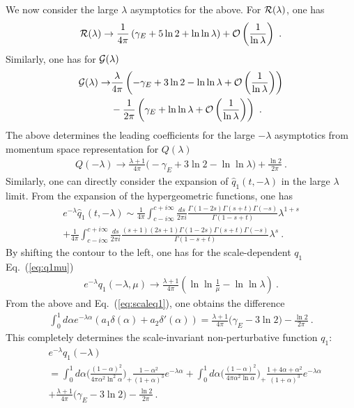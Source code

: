 \documentclass[a4paper,11pt]{article}
\begin{document}
We now consider the large $\lambda$ asymptotics for the above. For ${\cal R}(\lambda)$, one has 
\begin{align}
{\cal R}(\lambda)\rightarrow  \frac{1}{4\pi}\left(\gamma_E+5\ln 2+\ln \ln \lambda\right)+{\cal O}\left(\frac{1}{\ln \lambda}\right) \ .
\end{align}
Similarly, one has for ${\cal G}(\lambda)$
\begin{align}
{\cal G}(\lambda) \rightarrow &\frac{\lambda}{4\pi}\left(-\gamma_E+3\ln 2-\ln \ln \lambda+{\cal O}\left(\frac{1}{\ln \lambda}\right)\right)\nonumber \\ 
&-\frac{1}{2\pi}\left(\gamma_E+\ln \ln \lambda+{\cal O}\left(\frac{1}{\ln \lambda}\right)\right) \ .
\end{align}
The above determines the leading coefficients for the large $-\lambda$ asymptotics from momentum space representation for $Q(\lambda)$
\begin{align}
Q(-\lambda) \rightarrow \frac{\lambda+1}{4\pi}\bigg(-\gamma_E+3\ln 2-\ln \ln \lambda\bigg) +\frac{\ln 2}{2\pi} \ .
\end{align}
Similarly, one can directly consider the expansion of $\hat q_1(t,-\lambda)$ in the large $\lambda$ limit.   From the expansion of the hypergeometric functions, one has
\begin{align}
e^{-\lambda}\hat q_1(t,-\lambda) \sim \frac{1}{4\pi}\int_{c-i\infty}^{c+i\infty}\frac{ds}{2\pi i}\frac{\Gamma(1-2s)\Gamma(s+t)\Gamma(-s)}{\Gamma(1-s+t)}\lambda^{1+s} \nonumber \\ 
+\frac{1}{4\pi}\int_{c-i\infty}^{c+i\infty}\frac{ds}{2\pi i}\frac{(s+1)(2s+1)\Gamma(1-2s)\Gamma(s+t)\Gamma(-s)}{\Gamma(1-s+t)}\lambda^{s} \ .
\end{align}
By shifting the contour to the left, one has for the scale-dependent $q_1$ Eq.~(\ref{eq:q1mu})
\begin{align}
e^{-\lambda}q_1(-\lambda,\mu) \rightarrow \frac{\lambda+1}{4\pi}\left(\ln \ln \frac{1}{\mu}-\ln \ln \lambda\right) \ .
\end{align}
From the above and Eq.~(\ref{eq:scaleq1}), one obtains the difference 
\begin{align}
\int_{0}^1 d\alpha e^{-\lambda \alpha}\left(a_1\delta(\alpha)+a_2\delta'(\alpha)\right)=\frac{\lambda+1}{4\pi}\bigg(\gamma_E-3\ln 2\bigg) -\frac{\ln 2}{2\pi} \ .
\end{align}
This completely determines the scale-invariant non-perturbative function $q_1$:
\begin{align}\label{eq:q1full}
&e^{-\lambda}q_1(-\lambda)\nonumber \\ 
&=\int_{0}^{1} d\alpha \bigg(\frac{\left(1-\alpha\right)^2}{4\pi \alpha^2\ln ^2\alpha}\bigg)_{+}\frac{1-\alpha^2}{(1+\alpha)^3}e^{-\lambda \alpha}+\int_{0}^{1} d\alpha \bigg(\frac{\left(1-\alpha\right)^2}{4\pi \alpha^2\ln \alpha}\bigg)_{+}\frac{1+4\alpha+\alpha^2}{(1+\alpha)^3}e^{-\lambda \alpha} \nonumber \\ 
& + \frac{\lambda+1}{4\pi}\bigg(\gamma_E-3\ln 2\bigg) -\frac{\ln 2}{2\pi} \ .
\end{align}
\end{document}
